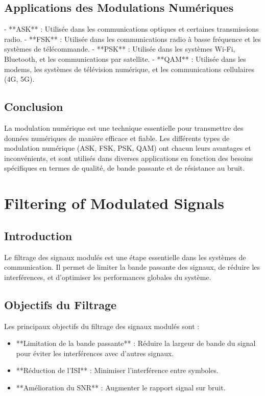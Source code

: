 \documentclass[10pt,a4paper]{article}
\begin{document}
\subsection*{Applications des Modulations Numériques}
- **ASK** : Utilisée dans les communications optiques et certaines transmissions radio.
- **FSK** : Utilisée dans les communications radio à basse fréquence et les systèmes de télécommande.
- **PSK** : Utilisée dans les systèmes Wi-Fi, Bluetooth, et les communications par satellite.
- **QAM** : Utilisée dans les modems, les systèmes de télévision numérique, et les communications cellulaires (4G, 5G).

\subsection*{Conclusion}
La modulation numérique est une technique essentielle pour transmettre des données numériques de manière efficace et fiable. Les différents types de modulation numérique (ASK, FSK, PSK, QAM) ont chacun leurs avantages et inconvénients, et sont utilisés dans diverses applications en fonction des besoins spécifiques en termes de qualité, de bande passante et de résistance au bruit.

\section*{Filtering of Modulated Signals}

\subsection*{Introduction}
Le filtrage des signaux modulés est une étape essentielle dans les systèmes de communication. Il permet de limiter la bande passante des signaux, de réduire les interférences, et d'optimiser les performances globales du système.

\subsection*{Objectifs du Filtrage}
Les principaux objectifs du filtrage des signaux modulés sont :
\begin{itemize}
    \item **Limitation de la bande passante** : Réduire la largeur de bande du signal pour éviter les interférences avec d'autres signaux.
    \item **Réduction de l'ISI** : Minimiser l'interférence entre symboles.
    \item **Amélioration du SNR** : Augmenter le rapport signal sur bruit.
\end{itemize}
\end{document}
